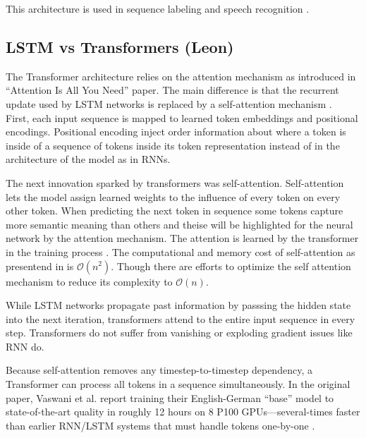 \documentclass[twoside,a4paper,10pt,DIV=12,BCOR=12mm]{scrartcl}
\begin{document}
This architecture is used in sequence labeling \cite{huang2015bidirectionallstmcrfmodelssequence} and speech recognition \cite{graves2013speechrecognitiondeeprecurrent}.

\subsection{LSTM vs Transformers (Leon)}

The Transformer architecture relies on the attention mechanism as introduced in “Attention Is All You Need” paper.
The main difference is that the recurrent update used by LSTM networks is replaced by a self-attention mechanism \cite{vaswani2017attention}.\\


First, each input sequence is mapped to learned token embeddings and positional encodings. Positional encoding 
inject order information about where a token is inside of a sequence of tokens inside its token representation instead of in the architecture of the model as in RNNs.


The next innovation sparked by transformers was self-attention. Self-attention lets the model assign learned weights to the influence of every token on every other token.
When predicting the next token in sequence some tokens capture more semantic meaning than others and theise will be highlighted for the neural network by the 
attention mechanism. The attention is learned by the transformer in the training process \cite{vaswani2017attention}.
The computational and memory cost of self-attention as presentend in \cite{vaswani2017attention} is $\mathcal{O}(n^2)$. Though there are efforts
to optimize the self attention mechanism to reduce its complexity to $\mathcal{O}(n)$. \cite{katharopoulos2020transformersrnnsfastautoregressive}


While LSTM networks propagate past information by passsing the hidden state into the next iteration, transformers attend to the entire input sequence in every
step. Transformers do not suffer from vanishing or exploding gradient issues like RNN do.


Because self-attention removes any timestep-to-timestep dependency, a Transformer can process all tokens in a sequence simultaneously. 
In the original paper, Vaswani et al. report training their English-German “base” model to state-of-the-art quality in roughly 
12 hours on 8 P100 GPUs—several-times faster than earlier RNN/LSTM systems that must handle tokens one-by-one \cite{vaswani2017attention}.
\end{document}
